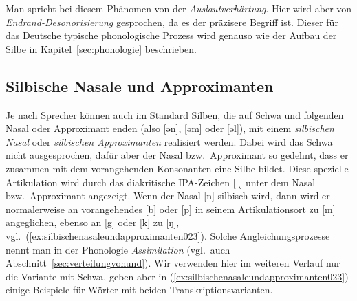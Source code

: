 \begin{exe}
  \ex\label{ex:auslautverhaertung011}
  \begin{xlist}
  \end{xlist}
  \ex\label{ex:auslautverhaertung015}
  \begin{xlist}
  \end{xlist}
  \ex\label{ex:auslautverhaertung019}
  \begin{xlist}
  \end{xlist}
\end{exe}

Man spricht bei diesem Phänomen von der \textit{Auslautverhärtung}.
Hier wird aber von \textit{Endrand-Desonorisierung} gesprochen, da es der präzisere Begriff ist.
Dieser für das Deutsche typische phonologische Prozess wird genauso wie der Aufbau der Silbe in Kapitel~\ref{sec:phonologie} beschrieben.

\subsection{Silbische Nasale und Approximanten}
\label{sec:silbischenasaleundapproximanten}

Je nach Sprecher können auch im Standard Silben, die auf Schwa und folgenden Nasal oder Approximant enden (also [ən], [əm] oder [əl]), mit einem \textit{silbischen Nasal} oder \textit{silbischen Approximanten} realisiert werden.
Dabei wird das Schwa nicht ausgesprochen, dafür aber der Nasal bzw.\ Approximant so gedehnt, dass er zusammen mit dem vorangehenden Konsonanten eine Silbe bildet.
Diese spezielle Artikulation wird durch das diakritische IPA-Zeichen [\, ̩] unter dem Nasal bzw.\ Approximant angezeigt.
Wenn der Nasal [n] silbisch wird, dann wird er normalerweise an vorangehendes [b] oder [p] in seinem Artikulationsort zu [m] angeglichen, ebenso an [g] oder [k] zu [ŋ], vgl.\ (\ref{ex:silbischenasaleundapproximanten023}).
Solche Angleichungsprozesse nennt man in der Phonologie \textit{Assimilation} (vgl.\ auch Abschnitt~\ref{sec:verteilungvonund}).
Wir verwenden hier im weiteren Verlauf nur die Variante mit Schwa, geben aber in (\ref{ex:silbischenasaleundapproximanten023}) einige Beispiele für Wörter mit beiden Transkriptionsvarianten.

